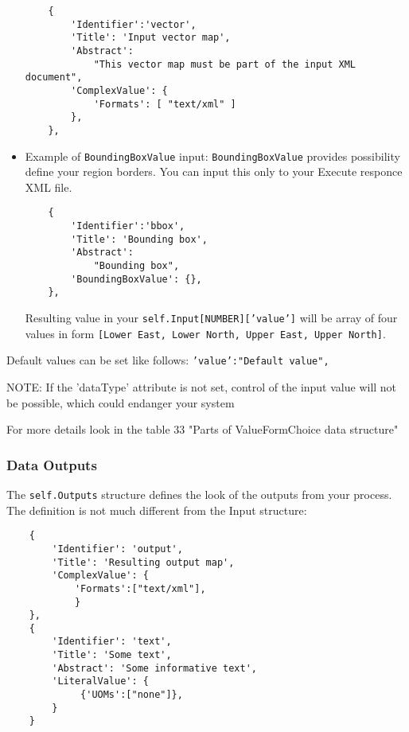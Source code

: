 \documentclass[a4paper,11pt]{article}
\begin{document}
\begin{itemize}
    \begin{verbatim}
    {
        'Identifier':'vector',
        'Title': 'Input vector map',
        'Abstract':
            "This vector map must be part of the input XML document",
        'ComplexValue': {
            'Formats': [ "text/xml" ]
        },
    },
    \end{verbatim}

        \item Example of \texttt{BoundingBoxValue} input:
        \texttt{BoundingBoxValue} provides possibility define your region
        borders. You can input this only to your Execute responce XML file.

    \begin{verbatim}
    {
        'Identifier':'bbox',
        'Title': 'Bounding box',
        'Abstract':
            "Bounding box",
        'BoundingBoxValue': {},
    },
    \end{verbatim}

    Resulting value in your \texttt{self.Input[NUMBER]['value']} will be
    array of four values in form \texttt{[Lower East, Lower North, Upper
    East, Upper North]}.
         
    \end{itemize}


     
    Default values can be set like follows: \texttt{'value':"Default value",}

    NOTE: If the 'dataType' attribute is not set, control of the input value
    will not be possible, which could endanger your system
     
    For more details look in the table 33 "Parts of ValueFormChoice data
    structure"


    \subsubsection{Data Outputs}
     
    The \texttt{self.Outputs} structure defines the look of the outputs from your process.
    The definition is not much different from the Input structure:
     

    \begin{verbatim}
    {
        'Identifier': 'output',
        'Title': 'Resulting output map',
        'ComplexValue': {
            'Formats':["text/xml"],
            }
    },
    {
        'Identifier': 'text',
        'Title': 'Some text',
        'Abstract': 'Some informative text',
        'LiteralValue': {
             {'UOMs':["none"]},
        }
    }
    \end{verbatim}
\end{document}
